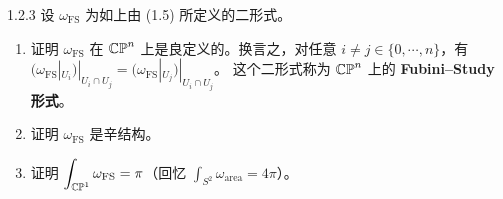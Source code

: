 \begin{wexer}{1.2.3}
设 $\omega_{\mathrm{FS}}$ 为如上由 (1.5) 所定义的二形式。
\begin{enumerate}[label=(\roman*)]
  \item 证明 $\omega_{\mathrm{FS}}$ 在 $\mathbb{CP}^n$ 上是良定义的。换言之，对任意
        $i\neq j\in\{0,\cdots,n\}$，有
        $(\omega_{\mathrm{FS}}|_{U_i})|_{U_i\cap U_j}=(\omega_{\mathrm{FS}}|_{U_j})|_{U_i\cap U_j}$。
        这个二形式称为 $\mathbb{CP}^n$ 上的 \textbf{Fubini--Study 形式}。
  \item 证明 $\omega_{\mathrm{FS}}$ 是辛结构。
  \item 证明 $\displaystyle\int_{\mathbb{CP}^1}\omega_{\mathrm{FS}}=\pi$（回忆
        $\displaystyle\int_{S^2}\omega_{\mathrm{area}}=4\pi$）。
\end{enumerate}
\end{wexer}
